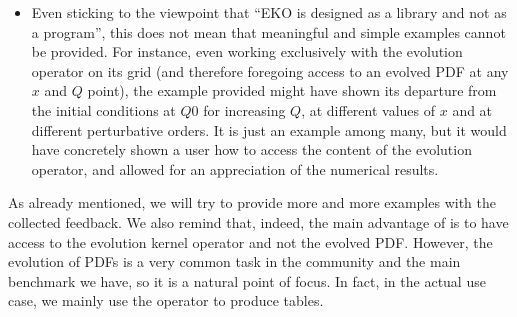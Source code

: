 \documentclass[a4paper,11pt]{article}
\begin{document}
\begin{response}{
  \begin{itemize}
    \item Even sticking to the viewpoint that ``EKO is designed as a library
      and not as a program'', this does not mean that meaningful and simple
      examples cannot be provided. For instance, even working exclusively with
      the evolution operator on its grid (and therefore foregoing access to an
      evolved PDF at any $x$ and $Q$ point), the example provided might have
      shown its departure from the initial conditions at $Q0$ for increasing
      $Q$, at different values of $x$ and at different perturbative orders. It
      is just an example among many, but it would have concretely shown a user
      how to access the content of the evolution operator, and allowed for an
      appreciation of the numerical results.
  \end{itemize}
}
As already mentioned, we will try to provide more and more examples with the
collected feedback.
We also remind that, indeed, the main advantage of \eko{} is to have access to
the evolution kernel operator and not the evolved PDF. However, the evolution
of PDFs is a very common task in the community and the main benchmark we have,
so it is a natural point of focus. 
In fact, in the actual use case, we mainly use the operator to produce \fk{}
tables.
\end{response}


% 
% 

\end{document}

